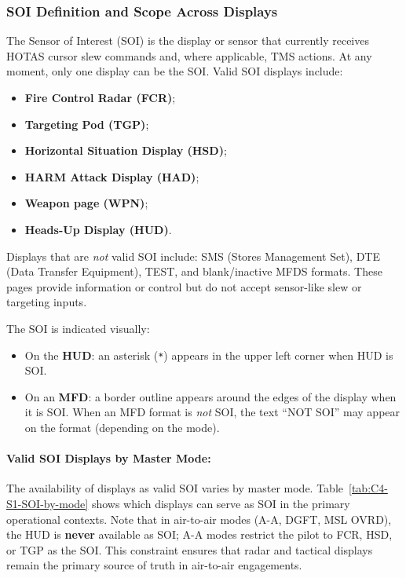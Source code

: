 \documentclass[11pt,a4paper]{article}
\begin{document}
\subsubsection{SOI Definition and Scope Across Displays}
\label{sec:C4-S1-S1}

The Sensor of Interest (SOI) is the display or sensor that currently receives HOTAS cursor slew commands and, where applicable, TMS actions. At any moment, only one display can be the SOI. Valid SOI displays include:

\begin{itemize}
    \item \textbf{Fire Control Radar (FCR)};
    \item \textbf{Targeting Pod (TGP)};
    \item \textbf{Horizontal Situation Display (HSD)};
    \item \textbf{HARM Attack Display (HAD)};
    \item \textbf{Weapon page (WPN)};
    \item \textbf{Heads-Up Display (HUD)}.
\end{itemize}

Displays that are \textit{not} valid SOI include: SMS (Stores Management Set), DTE (Data Transfer Equipment), TEST, and blank/inactive MFDS formats. These pages provide information or control but do not accept sensor-like slew or targeting inputs.

The SOI is indicated visually:
\begin{itemize}
    \item On the \textbf{HUD}: an asterisk (\texttt{*}) appears in the upper left corner when HUD is SOI.
    \item On an \textbf{MFD}: a border outline appears around the edges of the display when it is SOI. When an MFD format is \textit{not} SOI, the text ``NOT SOI'' may appear on the format (depending on the mode).
\end{itemize}

\paragraph{Valid SOI Displays by Master Mode:}
The availability of displays as valid SOI varies by master mode. Table~\ref{tab:C4-S1-SOI-by-mode} shows which displays can serve as SOI in the primary operational contexts. Note that in air-to-air modes (A-A, DGFT, MSL OVRD), the HUD is \textbf{never} available as SOI; A-A modes restrict the pilot to FCR, HSD, or TGP as the SOI. This constraint ensures that radar and tactical displays remain the primary source of truth in air-to-air engagements.
\end{document}

